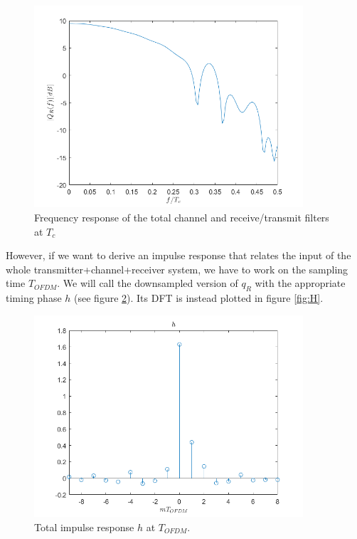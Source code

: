 \documentclass[a4paper,11.5pt]{article}
\begin{document}
\begin{figure}[H]
	\begin{center}   
		\includegraphics[width=10cm]{figs/Qmag_R.png} 
		\caption{Frequency response of the total channel and receive/transmit filters at $T_c$}
		\label{fig:Qmag_R}
	\end{center}
\end{figure}

However, if we want to derive an impulse response that relates the input of the whole transmitter+channel+receiver system, we have to work on the sampling time $T_{OFDM}$. We will call the downsampled version of $q_R$ with the appropriate timing phase $h$ (see figure \ref{fig:h}). Its DFT is instead plotted in figure \ref{fig:H}.

\begin{figure}[H]
	\begin{center}   
		\includegraphics[width=10cm]{figs/h.png} 
		\caption{Total impulse response $h$ at $T_{OFDM}$.}
		\label{fig:h}
	\end{center}
\end{figure}
\end{document}
